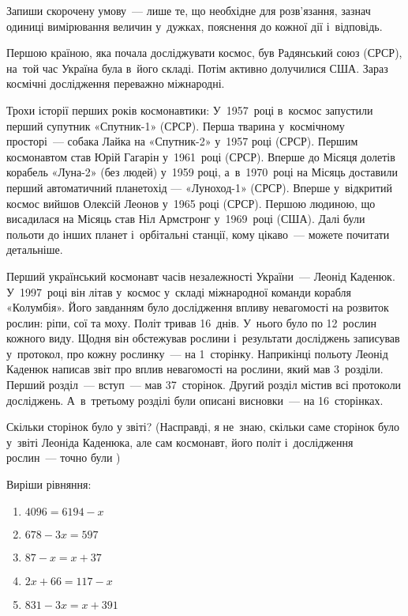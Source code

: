 \problem
Запиши скорочену умову~--- лише те, що необхідне для розв’язання,
зазнач одиниці вимірювання величин у~дужках, пояснення до кожної дії
і~відповідь.

Першою країною, яка почала досліджувати космос, був Радянський союз (СРСР),
на~той час Україна була в~його складі. Потім активно долучилися США.
Зараз космічні дослідження переважно міжнародні.

Трохи історії перших років космонавтики:
У~1957~році в~космос запустили перший супутник «Спутник-1» (СРСР).
Перша тварина у~космічному просторі~--- собака Лайка на «Спутник-2»
у~1957 році (СРСР).
Першим космонавтом став Юрій Гагарін у~1961~році (СРСР).
Вперше до Місяця долетів корабель «Луна-2» (без людей) у~1959 році,
а~в~1970~році на Місяць доставили перший автоматичний планетохід —
«Луноход-1» (СРСР).
Вперше у~відкритий космос вийшов Олексій Леонов у~1965 році (СРСР).
Першою людиною, що висадилася на Місяць став Ніл Армстронг у~1969~році (США).
Далі були польоти до інших планет і~орбітальні станції,
кому цікаво~--- можете почитати детальніше.

Перший український космонавт часів незалежності України~--- Леонід Каденюк.
У~1997~році він літав у~космос у~складі міжнародної команди корабля «Колумбія».
Його завданням було дослідження впливу невагомості на розвиток рослин:
ріпи, сої та моху. Політ тривав 16~днів. У~нього було по 12~рослин кожного виду.
Щодня він обстежував рослини і~результати досліджень записував у~протокол,
про кожну рослинку~--- на 1~сторінку. Наприкінці польоту Леонід Каденюк
написав звіт про вплив невагомості на рослини, який мав 3~розділи.
Перший розділ~--- вступ~--- мав 37~сторінок. Другий розділ містив всі
протоколи досліджень. А~в~третьому розділі були описані висновки~---
на 16~сторінках.

Скільки сторінок було у звіті?
(Насправді, я не~знаю, скільки саме сторінок було у~звіті Леоніда Каденюка,
але сам космонавт, його політ і~дослідження рослин~--- точно були \smiley)


\problem
Виріши рівняння:
\begin{multicols}{2}
    \begin{enumerate}
        \item $4096 = 6194 - x$
        \item $678 - 3x = 597$
        \item $87 - x = x + 37$
        \item $2x + 66 = 117 - x$
        \item $831 - 3x = x + 391$
    \end{enumerate}
\end{multicols}


